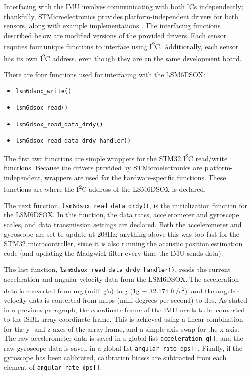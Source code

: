 \documentclass[12pt,a4paper]{report}
\begin{document}
Interfacing with the IMU involves communicating with both ICs independently; thankfully, STMicroelectronics provides platform-independent drivers for both sensors, along with example implementations \cite{lis3mdl_st} \cite{lsm6dsox_st}. The interfacing functions described below are modified versions of the provided drivers. Each sensor requires four unique functions to interface using I\textsuperscript{2}C. Additionally, each sensor has its own I\textsuperscript{2}C address, even though they are on the same development board.

There are four functions used for interfacing with the LSM6DSOX:
\begin{itemize}[noitemsep,topsep=0pt,]
	\item \verb|lsm6dsox_write()|
	\item \verb|lsm6dsox_read()|
	\item \verb|lsm6dsox_read_data_drdy()|
	\item \verb|lsm6dsox_read_data_drdy_handler()|
\end{itemize}

The first two functions are simple wrappers for the STM32 I\textsuperscript{2}C read/write functions. Because the drivers provided by STMicroelectronics are platform-independent, wrappers are used for the hardware-specific functions. These functions are where the I\textsuperscript{2}C address of the LSM6DSOX is declared.

The next function, \verb|lsm6dsox_read_data_drdy()|, is the initialization function for the LSM6DSOX. In this function, the data rates, accelerometer and gyroscope scales, and data transmission settings are declared. Both the accelerometer and gyroscope are set to update at 208Hz; anything above this was too fast for the STM32 microcontroller, since it is also running the acoustic position estimation code (and updating the Madgwick filter every time the IMU sends data). 

The last function, \verb|lsm6dsox_read_data_drdy_handler()|, reads the current acceleration and angular velocity data from the LSM6DSOX. The acceleration data is converted from mg (milli-g’s) to g (1g = 32.174 ft/s\textsuperscript{2}), and the angular velocity data is converted from mdps (milli-degrees per second) to dps. As stated in a previous paragraph, the coordinate frame of the IMU needs to be converted to the iSBL array coordinate frame. This is achieved using a linear combination for the y- and z-axes of the array frame, and a simple axis swap for the x-axis. The raw accelerometer data is saved in a global list \verb|acceleration_g[]|, and the raw gyroscope data is saved in a global list \verb|angular_rate_dps[]|. Finally, if the gyroscope has been calibrated, calibration biases are subtracted from each element of \verb|angular_rate_dps[]|.
\end{document}

